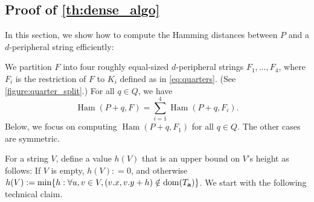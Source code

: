 \documentclass[twoside,leqno]{article}
\newcommand{\Ta}{T_\mathbf{a}}
\DeclareMathOperator*{\Ham}{Ham}
\begin{document}
\subsection{Proof of \cref{th:dense_algo}}
In this section, we show how to compute the Hamming distances between $P$ and a $d$-peripheral string efficiently:

\restateThmDenseAlgo

We partition $F$ into four roughly equal-sized $d$-peripheral strings $F_1, \dots, F_4$, where $F_i$ is the restriction of $F$ to $K_i$ defined as in \cref{eq:quarters}. (See \cref{figure:quarter_split}.) For all $q \in Q$, we have 
%
$$\Ham(P + q, F) = \sum_{i = 1}^4 \Ham(P + q, F_i).$$
%
Below, we focus on computing $\Ham(P + q, F_1)$ for all $q \in Q$. The other cases are symmetric. 

For a string $V$, define a value $h(V)$ that is an upper bound on $V$'s height as follows: If $V$ is empty, $h(V): = 0$, and otherwise $h(V) := \min \{h : \forall u,v \in V, (\x{v}, \y{v} + h) \notin \d{\Ta}\}$. We start with the following technical claim.
\end{document}
